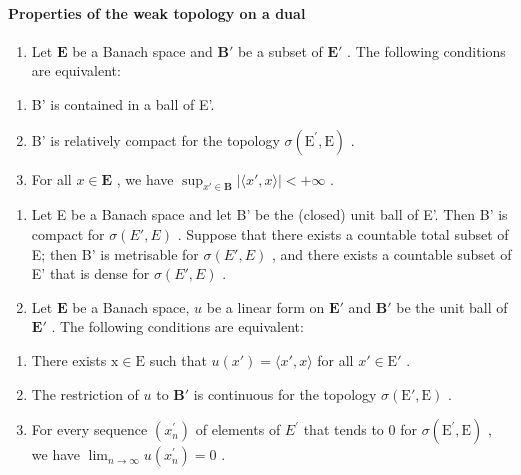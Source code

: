 \paragraph{Properties of the weak topology on a dual}

\begin{enumerate}
\def\labelenumi{\arabic{enumi})}
\setcounter{enumi}{17}
\tightlist
\item
  Let \(\mathbf{E}\) be a Banach space and \(\mathbf{B}'\) be a subset of \(\mathbf{E}'\) . The following conditions are equivalent:
\end{enumerate}

\begin{enumerate}
\def\labelenumi{(\roman{enumi})}
\item
  B' is contained in a ball of E'.
\item
  B' is relatively compact for the topology \(\sigma(\mathrm{E}^{\prime}, \mathrm{E})\) .
\item
  For all \(x \in \mathbf{E}\) , we have \(\sup_{x' \in \mathbf{B}} |\langle x', x \rangle| < +\infty\) .
\end{enumerate}

\begin{enumerate}
\def\labelenumi{\arabic{enumi})}
\setcounter{enumi}{18}
\item
  Let E be a Banach space and let B' be the (closed) unit ball of E'. Then B' is compact for \(\sigma(E', E)\) . Suppose that there exists a countable total subset of E; then B' is metrisable for \(\sigma(E', E)\) , and there exists a countable subset of E' that is dense for \(\sigma(E', E)\) .
\item
  Let \(\mathbf{E}\) be a Banach space, \(u\) be a linear form on \(\mathbf{E}'\) and \(\mathbf{B}'\) be the unit ball of \(\mathbf{E}'\) . The following conditions are equivalent:
\end{enumerate}

\begin{enumerate}
\def\labelenumi{(\roman{enumi})}
\item
  There exists \(\mathrm{x} \in \mathrm{E}\) such that \(u(x') = \langle x', x \rangle\) for all \(x' \in \mathrm{E}'\) .
\item
  The restriction of \(u\) to \(\mathbf{B}'\) is continuous for the topology \(\sigma(\mathrm{E}', \mathrm{E})\) .
\item
  For every sequence \((x_{n}^{\prime})\) of elements of \(E^{\prime}\) that tends to 0 for \(\sigma(\mathrm{E}^{\prime}, \mathrm{E})\) , we have \(\lim_{n \to \infty} u(x_{n}^{\prime}) = 0\) .
\end{enumerate}

